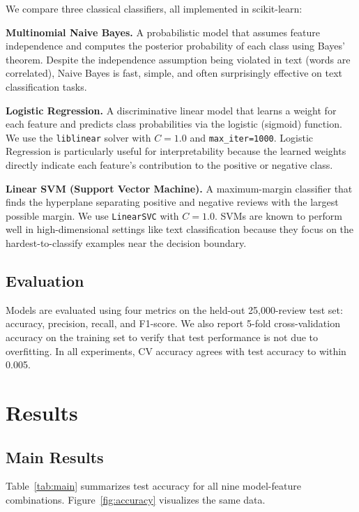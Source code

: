 \documentclass[11pt]{article}
\begin{document}
We compare three classical classifiers, all implemented in scikit-learn:

\textbf{Multinomial Naive Bayes.} A probabilistic model that assumes feature independence and computes the posterior probability of each class using Bayes' theorem. Despite the independence assumption being violated in text (words are correlated), Naive Bayes is fast, simple, and often surprisingly effective on text classification tasks.

\textbf{Logistic Regression.} A discriminative linear model that learns a weight for each feature and predicts class probabilities via the logistic (sigmoid) function. We use the \texttt{liblinear} solver with $C = 1.0$ and \texttt{max\_iter=1000}. Logistic Regression is particularly useful for interpretability because the learned weights directly indicate each feature's contribution to the positive or negative class.

\textbf{Linear SVM (Support Vector Machine).} A maximum-margin classifier that finds the hyperplane separating positive and negative reviews with the largest possible margin. We use \texttt{LinearSVC} with $C = 1.0$. SVMs are known to perform well in high-dimensional settings like text classification because they focus on the hardest-to-classify examples near the decision boundary.

\subsection{Evaluation}

Models are evaluated using four metrics on the held-out 25,000-review test set: accuracy, precision, recall, and F1-score. We also report 5-fold cross-validation accuracy on the training set to verify that test performance is not due to overfitting. In all experiments, CV accuracy agrees with test accuracy to within 0.005.

\section{Results}

\subsection{Main Results}

Table~\ref{tab:main} summarizes test accuracy for all nine model-feature combinations. Figure~\ref{fig:accuracy} visualizes the same data.
\end{document}
